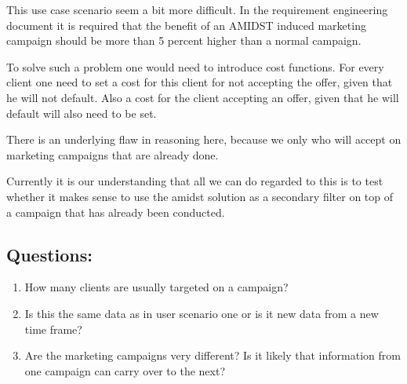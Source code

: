 \documentclass{article}
\theoremstyle{theorem}
\theoremstyle{definition}
\begin{document}
This use case scenario seem a bit more difficult.  In the requirement engineering document it is required that the benefit of an AMIDST induced marketing campaign should be more than 5 percent higher than a normal campaign. 

To solve such a problem one would need to introduce cost functions.  For every client one need to set a cost for this client for not accepting the offer, given that he will not default.  Also a cost for the client accepting an offer, given that he will default will also need to be set.  

There is an underlying flaw in reasoning here, because we only who will accept on marketing campaigns that are already done.  

Currently it is our understanding that all we can do regarded to this is to test whether it makes sense to use the amidst solution as a secondary filter on top of a campaign that has already been conducted.



\subsection*{Questions: }
\begin{enumerate}
\item How many clients are usually targeted on a campaign?
\item Is this the same data as in user scenario one or is it new data from a new time frame?
\item Are the marketing campaigns very different? Is it likely that information from one campaign can carry over to the next?
\end{enumerate}



\end{document}

